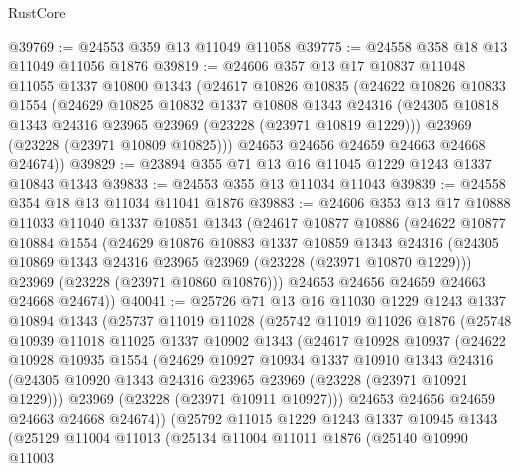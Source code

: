 \begin{lexlean}{RustCore}
\begin{coremodule}
@39769 := @24553 @359 @13 @11049 @11058
@39775 := @24558 @358 @18 @13 @11049 @11056 @1876
@39819 := @24606
    @357
    @13
    @17
    @10837
    @11048
    @11055
    @1337
    @10800
    @1343
    (@24617
      @10826
      @10835
      (@24622
        @10826
        @10833
        @1554
        (@24629
          @10825
          @10832
          @1337
          @10808
          @1343
          @24316
          (@24305 @10818 @1343 @24316 @23965 @23969 (@23228 (@23971 @10819 @1229)))
          @23969
          (@23228 (@23971 @10809 @10825)))
        @24653
        @24656
        @24659
        @24663
        @24668
        @24674))
@39829 := @23894 @355 @71 @13 @16 @11045 @1229 @1243 @1337 @10843 @1343
@39833 := @24553 @355 @13 @11034 @11043
@39839 := @24558 @354 @18 @13 @11034 @11041 @1876
@39883 := @24606
    @353
    @13
    @17
    @10888
    @11033
    @11040
    @1337
    @10851
    @1343
    (@24617
      @10877
      @10886
      (@24622
        @10877
        @10884
        @1554
        (@24629
          @10876
          @10883
          @1337
          @10859
          @1343
          @24316
          (@24305 @10869 @1343 @24316 @23965 @23969 (@23228 (@23971 @10870 @1229)))
          @23969
          (@23228 (@23971 @10860 @10876)))
        @24653
        @24656
        @24659
        @24663
        @24668
        @24674))
@40041 := @25726
    @71
    @13
    @16
    @11030
    @1229
    @1243
    @1337
    @10894
    @1343
    (@25737
      @11019
      @11028
      (@25742
        @11019
        @11026
        @1876
        (@25748
          @10939
          @11018
          @11025
          @1337
          @10902
          @1343
          (@24617
            @10928
            @10937
            (@24622
              @10928
              @10935
              @1554
              (@24629
                @10927
                @10934
                @1337
                @10910
                @1343
                @24316
                (@24305 @10920 @1343 @24316 @23965 @23969 (@23228 (@23971 @10921 @1229)))
                @23969
                (@23228 (@23971 @10911 @10927)))
              @24653
              @24656
              @24659
              @24663
              @24668
              @24674))
          (@25792
            @11015
            @1229
            @1243
            @1337
            @10945
            @1343
            (@25129
              @11004
              @11013
              (@25134
                @11004
                @11011
                @1876
                (@25140
                  @10990
                  @11003

\end{coremodule}
\end{lexlean}
